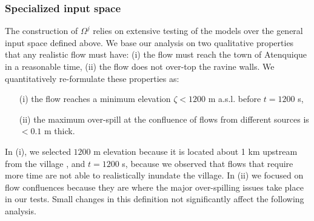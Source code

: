 \documentclass[nhess, manuscript]{copernicus}
\begin{document}
\subsubsection{Specialized input space}
The construction of $\Omega^j$ relies on extensive testing of the models over the general input space defined above. We base our analysis on two qualitative properties that any realistic  flow must have: (i) the flow must reach the town of Atenquique in a reasonable time, (ii) the flow does not over-top the ravine walls. We quantitatively re-formulate these properties as:
\begin{itemize}
\item[(i)] the flow reaches a minimum elevation $\zeta<1200$ m a.s.l. before $t=1200$ s,
\item[(ii)] the maximum over-spill at the confluence of flows from different sources is $<0.1$ m thick.
\end{itemize}
In (i), we selected $1200$ m elevation because it is located about 1 km upstream from the village \citep{Saucedo2008}, and $t=1200$ s, because we observed that flows that require more time are not able to realistically inundate the village. In (ii) we focused on flow confluences because they are where the major over-spilling issues take place in our tests. Small changes in this definition  not significantly affect the following analysis.
\end{document}
